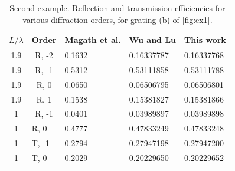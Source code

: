 \documentclass[reprint,amsmath,amssymb,
 aps]{revtex4-2}
\begin{document}
\begin{table}[h!]
\centering
\caption{Second example. Reflection and transmission efficiencies for various diffraction orders, for grating (b) of \cref{fig:ex1}.}
\label{tab:ex1_2} 
\begin{ruledtabular}
\begin{tabular}{cclll}
\multicolumn{1}{l}{$L/\lambda$} & Order                     & \multicolumn{1}{c}{Magath et al. \cite{magath2005fast}} & \multicolumn{1}{c}{Wu and Lu} \cite{wu2009analyzing} & \multicolumn{1}{c}{This work} \\ \hline
1.9                             & R, -2                     & 0.1632                            & 0.16337787                    & 0.16337768                    \\
1.9                             & R, -1                     & 0.5312                            & 0.53111858                    & 0.53111788                    \\
1.9                             & R, 0                      & 0.0650                            & 0.06506795                    & 0.06506801                    \\
1.9                             & R, 1                      & 0.1538                            & 0.15381827                    & 0.15381866                    \\ \hline
1                               & R, -1                     & 0.0401                            & 0.03989897                    & 0.03989898                    \\
1                               & \multicolumn{1}{l}{R, 0}  & 0.4777                            & 0.47833249                    & 0.47833248                    \\
1                               & \multicolumn{1}{l}{T, -1} & 0.2794                            & 0.27947198                    & 0.27947200                    \\
1                               & \multicolumn{1}{l}{T, 0}  & 0.2029                            & 0.20229650                    & 0.20229652                   
\end{tabular} 
\end{ruledtabular}
\end{table}
\end{document}
